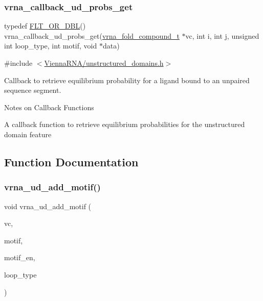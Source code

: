 \subsubsection{\texorpdfstring{vrna\+\_\+callback\+\_\+ud\+\_\+probs\+\_\+get}{vrna\_callback\_ud\_probs\_get}}
{\footnotesize\ttfamily typedef \hyperlink{group__data__structures_ga31125aeace516926bf7f251f759b6126}{F\+L\+T\+\_\+\+O\+R\+\_\+\+D\+BL}() vrna\+\_\+callback\+\_\+ud\+\_\+probs\+\_\+get(\hyperlink{group__fold__compound_ga1b0cef17fd40466cef5968eaeeff6166}{vrna\+\_\+fold\+\_\+compound\+\_\+t} $\ast$vc, int i, int j, unsigned int loop\+\_\+type, int motif, void $\ast$data)}



{\ttfamily \#include $<$\hyperlink{unstructured__domains_8h}{Vienna\+R\+N\+A/unstructured\+\_\+domains.\+h}$>$}



Callback to retrieve equilibrium probability for a ligand bound to an unpaired sequence segment. 

\begin{DoxyRefDesc}{Notes on Callback Functions}
\item[\hyperlink{callbacks__callbacks000015}{Notes on Callback Functions}]A callback function to retrieve equilibrium probabilities for the unstructured domain feature \end{DoxyRefDesc}


\subsection{Function Documentation}
\mbox{\label{group__domains__up_gaec0c3313fb2951946614f920d289829a}} 
\subsubsection{\texorpdfstring{vrna\+\_\+ud\+\_\+add\+\_\+motif()}{vrna\_ud\_add\_motif()}}
{\footnotesize\ttfamily void vrna\+\_\+ud\+\_\+add\+\_\+motif (\begin{DoxyParamCaption}\item[{\hyperlink{group__fold__compound_ga1b0cef17fd40466cef5968eaeeff6166}{vrna\+\_\+fold\+\_\+compound\+\_\+t} $\ast$}]{vc,  }\item[{const char $\ast$}]{motif,  }\item[{double}]{motif\+\_\+en,  }\item[{unsigned int}]{loop\+\_\+type }\end{DoxyParamCaption})}



